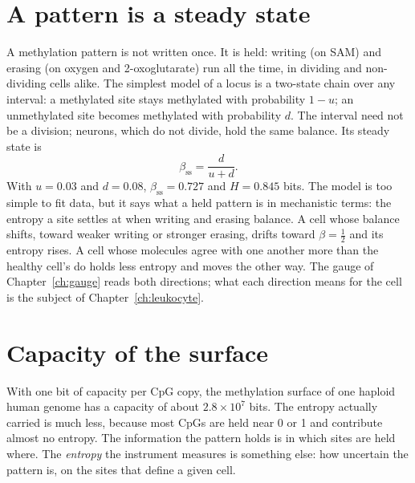 \section{A pattern is a steady state}

A methylation pattern is not written once. It is held: writing (on SAM) and erasing (on oxygen and
2-oxoglutarate) run all the time, in dividing and non-dividing cells alike. The simplest model of a locus is a two-state chain
over any interval: a methylated site stays methylated with probability $1-u$; an unmethylated site becomes methylated with
probability $d$. The interval need not be a division; neurons, which do not divide, hold the same balance. Its steady state is
\begin{equation}
  \beta_{\mathrm{ss}}=\frac{d}{u+d}.
  \label{eq:steady}
\end{equation}
\derived{} With $u=0.03$ and $d=0.08$, $\beta_{\mathrm{ss}}=0.727$ and $H=0.845$ bits. \calc{} The model is too simple to
fit data, but it says what a held pattern is in mechanistic terms: the entropy a site settles at when writing and erasing
balance. A cell whose balance shifts, toward weaker writing or stronger erasing, drifts toward $\beta=\tfrac12$
and its entropy rises. A cell whose molecules agree with one another more than the healthy cell's do holds less entropy and
moves the other way. The gauge of Chapter~\ref{ch:gauge} reads both directions; what each direction
means for the cell is the subject of Chapter~\ref{ch:leukocyte}.

\section{Capacity of the surface}

With one bit of capacity per CpG copy, the methylation surface of one haploid human genome has a capacity of about
$2.8\times10^7$ bits. \calc{} The entropy actually carried is much less, because most CpGs are held near 0 or 1 and contribute
almost no entropy. The information the pattern holds is in which sites are held where. The \emph{entropy} the instrument
measures is something else: how uncertain the pattern is, on the sites that define a given cell.
